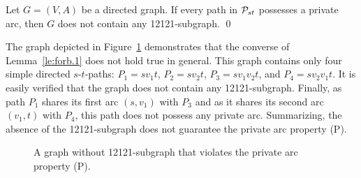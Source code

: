 \documentclass[runningheads]{llncs}
\begin{document}
\begin{lemma}
\label{le:forb.1}
Let $G=(V,A)$ be a directed graph. 
If every path in ${\cal P}_{st}$ possesses a private arc,
then $G$ does not contain any 12121-subgraph.
\qed
\end{lemma}

The graph depicted in Figure~\ref{fig:bad-example} demonstrates that the 
converse of Lemma~\ref{le:forb.1} does not hold true in general.
This graph contains only four simple directed $s$-$t$-paths: 
$P_1=sv_1t$,
$P_2=sv_2t$,
$P_3=sv_1v_2t$, and
$P_4=sv_2v_1t$.
It is easily verified that the graph does not contain any 12121-subgraph.
Finally, as path $P_1$ shares its first arc $(s,v_1)$ with $P_3$ and as it shares
its second arc $(v_1,t)$ with $P_4$, this path does not possess any private arc.
Summarizing, the absence of the 12121-subgraph does not guarantee the private arc property (P).

\begin{figure}[bth]
\begin{center}
\end{center}
\vspace{-3.0ex}
\caption{A graph without 12121-subgraph that violates the private arc property (P).}
\label{fig:bad-example}
\end{figure}
\end{document}

